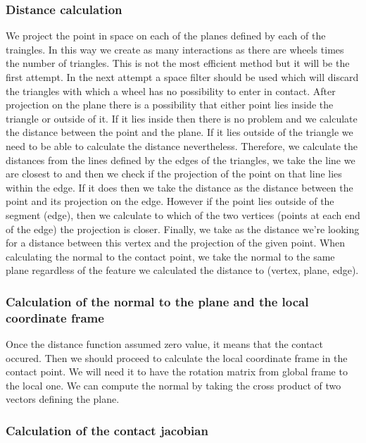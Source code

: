 \documentclass[11pt]{article}
\begin{document}
  
\subsubsection{Distance calculation}
\label{sec-2.2.1}


    We project the point in space on each of the planes defined by each of the traingles.
    In this way we create as many interactions as there are wheels times the number of
    triangles. This is not the most efficient method but it will be the first attempt.
    In the next attempt a space filter should be used which will discard the triangles
    with which a wheel has no possibility to enter in contact. 
    After projection on the plane there is a possibility that either point lies inside the 
    triangle or outside of it. If it lies inside then there is no problem and we calculate
    the distance between the point and the plane.
    If it lies outside of the triangle we need to be able to 
    calculate the distance nevertheless. Therefore, we calculate the distances from the 
    lines defined by the edges of the triangles, we take the line we are closest to and
    then we check if the projection of the point on that line lies within the edge.
    If it does then we take the distance as the distance between the point and its projection
    on the edge. However if the point lies outside of the segment (edge), then we calculate
    to which of the two vertices (points at each end of the edge) the projection is closer.
    Finally, we take as the distance we're looking for a distance between this vertex and 
    the projection of the given point.
    When calculating the normal to the contact point, we take the normal to the same 
    plane regardless of the feature we calculated the distance to (vertex, plane, edge).

\subsubsection{Calculation of the normal to the plane and the local coordinate frame}
\label{sec-2.2.2}


    Once the distance function assumed zero value, it means that the contact occured.
    Then we should proceed to calculate the local coordinate frame in the contact point. 
    We will need it to have the rotation matrix from global frame to the local one.
    We can compute the normal by taking the cross product of two vectors defining the plane.

\subsubsection{Calculation of the contact jacobian}
\label{sec-2.2.3}
\end{document}

